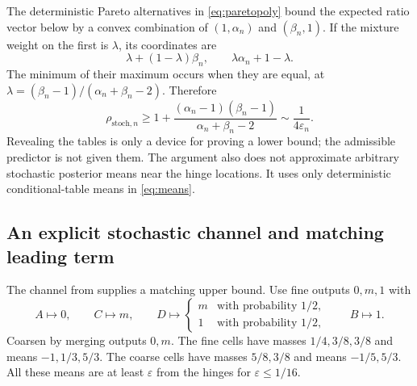 \documentclass[11pt]{article}
\theoremstyle{definition}\newtheorem{definition}[theorem]{Definition}
\theoremstyle{remark}\newtheorem{remark}[theorem]{Remark}
\newcommand{\stp}{\mathrm{stoch}}
\begin{document}
The deterministic Pareto alternatives in \eqref{eq:paretopoly} bound the expected ratio vector below by a convex combination of $(1,\alpha_n)$ and $(\beta_n,1)$. If the mixture weight on the first is $\lambda$, its coordinates are
\[
\lambda+(1-\lambda)\beta_n,\qquad
\lambda\alpha_n+1-\lambda.
\]
The minimum of their maximum occurs when they are equal, at
$\lambda=(\beta_n-1)/(\alpha_n+\beta_n-2)$. Therefore
\begin{equation}
\rho_{\stp,n}\ge
1+\frac{(\alpha_n-1)(\beta_n-1)}{\alpha_n+\beta_n-2}
\sim\frac1{4\varepsilon_n}.
\label{eq:stochlower}
\end{equation}
Revealing the tables is only a device for proving a lower bound; the admissible predictor is not given them. The argument also does not approximate arbitrary stochastic posterior means near the hinge locations. It uses only deterministic conditional-table means in \eqref{eq:means}.

\subsection{An explicit stochastic channel and matching leading term}
\label{sec:stochasticupper}
The channel from \cite[Lemma 4.3]{huang7} supplies a matching upper bound. Use fine outputs $0,m,1$ with
\[
A\mapsto0,\qquad C\mapsto m,\qquad
D\mapsto\begin{cases}m&\text{with probability }1/2,\\1&\text{with probability }1/2,\end{cases}
\qquad B\mapsto1.
\]
Coarsen by merging outputs $0,m$. The fine cells have masses $1/4,3/8,3/8$ and means $-1,1/3,5/3$. The coarse cells have masses $5/8,3/8$ and means $-1/5,5/3$. All these means are at least $\varepsilon$ from the hinges for $\varepsilon\le1/16$.
\end{document}
